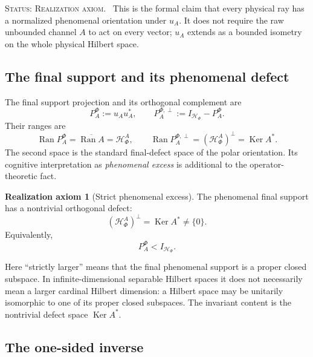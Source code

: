 \documentclass[11pt,reqno]{scrartcl}
\newcommand{\scrHF}{\mathscr H_{\Phi}}
\newcommand{\polA}{u_A}
\DeclareMathOperator{\Ran}{Ran}
\DeclareMathOperator{\Ker}{Ker}
\newcommand{\statuslabel}[1]{\par\smallskip\noindent\textsc{Status: #1.}\ }
\newcommand{\actHF}{\mathscr H_{\Phi}^{A}}
\newcommand{\suppProjF}{P_{A}^{\Phi}}
\newcommand{\defectProjF}{P_{A}^{\Phi,\perp}}
\newcommand{\defectHF}{(\mathscr H_{\Phi}^{A})^{\perp}}
\theoremstyle{plain}
\theoremstyle{definition}
\newtheorem{axiom}[axiom]{Realization axiom}
\theoremstyle{remark}
\begin{document}
\statuslabel{Realization axiom} This is the formal claim that every physical
ray has a normalized phenomenal orientation under $u_A$.  It does not require
the raw unbounded channel $A$ to act on every vector; $u_A$ extends as a
bounded isometry on the whole physical Hilbert space.

\subsection{The final support and its phenomenal defect}

The final support projection and its orthogonal complement are
\begin{equation}
  \boxed{
  \suppProjF:=\polA\polA^*,
  \qquad
  \defectProjF:=I_{\scrHF}-\suppProjF.}
  \label{eq:rep-excess-projections}
\end{equation}
Their ranges are
\begin{equation}
  \Ran\suppProjF=\overline{\Ran A}=\actHF,
  \qquad
  \Ran\defectProjF=(\actHF)^{\perp}=\Ker A^*.
  \label{eq:rep-excess-ranges}
\end{equation}
The second space is the standard final-defect space of the polar orientation.
Its cognitive interpretation as \emph{phenomenal excess} is additional to the
operator-theoretic fact.

\begin{axiom}[Strict phenomenal excess]
\label{ax:strict-phenomenal-excess}
The phenomenal final support has a nontrivial orthogonal defect:
\begin{equation}
  \boxed{
  \defectHF
  =\Ker A^*
  \neq\{0\}.}
  \label{eq:strict-phenomenal-excess}
\end{equation}
Equivalently,
\begin{equation}
  \suppProjF<I_{\scrHF}.
\end{equation}
\end{axiom}

Here ``strictly larger'' means that the final phenomenal support is a proper
closed subspace.  In infinite-dimensional separable Hilbert spaces it does
not necessarily mean a larger cardinal Hilbert dimension: a Hilbert space may
be unitarily isomorphic to one of its proper closed subspaces.  The invariant
content is the nontrivial defect space $\Ker A^*$.

\subsection{The one-sided inverse}
\end{document}
